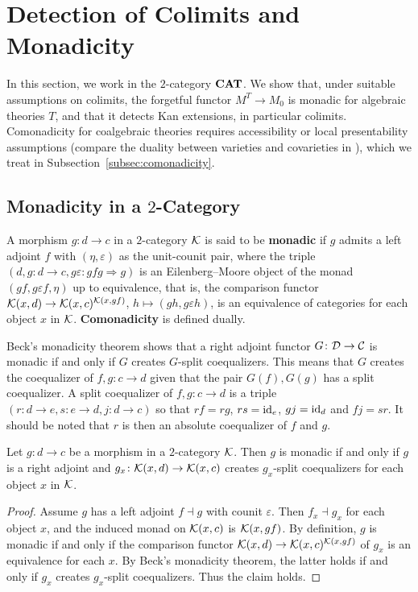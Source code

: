 
\section{Detection of Colimits and Monadicity}\label{sec:monadicity}

In this section, we work in the $2$-category $\mathbf{CAT}$. We show that, under suitable assumptions on colimits, the forgetful functor $M^T\to M_0$ is monadic for algebraic theories $T$, and that it detects Kan extensions, in particular colimits. Comonadicity for coalgebraic theories requires accessibility or local presentability assumptions (compare the duality between varieties and covarieties in \cite{adamekVarietiesCovarietiesCategory2003}), which we treat in Subsection~\ref{subsec:comonadicity}.

\subsection{Monadicity in a \texorpdfstring{$2$}{2}-Category}
\begin{definition}
    A morphism $g\colon d\to c$ in a $2$-category $\mathcal{K}$ is said to be \textbf{monadic} if $g$ admits a left adjoint $f$ with $(\eta,\varepsilon)$ as the unit-counit pair, where the triple $(d,g\colon d\to c,g\varepsilon\colon gfg\Rightarrow g)$ is an Eilenberg--Moore object of the monad $(gf,g\varepsilon f,\eta)$ up to equivalence, that is, the comparison functor $\mathcal{K}(x,d)\to\mathcal{K}(x,c)^{\mathcal{K}(x,gf)}$, $h\mapsto (gh,g\varepsilon h)$, is an equivalence of categories for each object $x$ in $\mathcal{K}$. \textbf{Comonadicity} is defined dually.
\end{definition}
Beck's monadicity theorem shows that a right adjoint functor $G\colon \mathcal{D}\to\mathcal{C}$ is monadic if and only if $G$ creates $G$-split coequalizers. This means that $G$ creates the coequalizer of $f,g\colon c\to d$ given that the pair $G(f),G(g)$ has a split coequalizer. A split coequalizer of $f,g\colon c\to d$ is a triple $(r\colon d\to e,s\colon e\to d, j\colon d\to c)$ so that $rf = rg$, $rs = \mathrm{id}_e$, $gj = \mathrm{id}_d$ and $fj = sr$.
It should be noted that $r$ is then an absolute coequalizer of $f$ and $g$.
\begin{lemma}\label{lem:2DimMonadicity}
    Let $g\colon d\to c$ be a morphism in a $2$-category $\mathcal{K}$. Then $g$ is monadic if and only if $g$ is a right adjoint and $g_x\colon \mathcal{K}(x,d)\to \mathcal{K}(x,c)$ creates $g_x$-split coequalizers for each object $x$ in $\mathcal{K}$.
\end{lemma}
\begin{proof}
    Assume $g$ has a left adjoint $f\dashv g$ with counit $\varepsilon$. Then $f_x\dashv g_x$ for each object $x$, and the induced monad on $\mathcal{K}(x,c)$ is $\mathcal{K}(x,gf)$. By definition, $g$ is monadic if and only if the comparison functor $\mathcal{K}(x,d)\to\mathcal{K}(x,c)^{\mathcal{K}(x,gf)}$ of $g_x$ is an equivalence for each $x$. By Beck's monadicity theorem, the latter holds if and only if $g_x$ creates $g_x$-split coequalizers. Thus the claim holds.
\end{proof}

